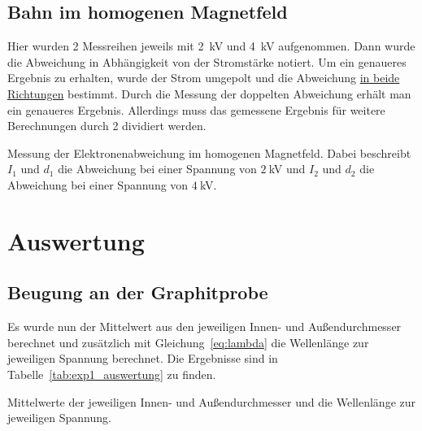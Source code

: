 \documentclass{article}
\begin{document}
%



\subsection{Bahn im homogenen Magnetfeld}
Hier wurden 2 Messreihen jeweils mit 2~kV und 4~kV aufgenommen. 	Dann wurde die Abweichung in Abhängigkeit von der Stromstärke notiert. Um ein genaueres Ergebnis zu erhalten, wurde der Strom umgepolt und die Abweichung \underline{in beide Richtungen} bestimmt. Durch die Messung der doppelten Abweichung erhält man ein genaueres Ergebnis. Allerdings muss das gemessene Ergebnis für weitere Berechnungen durch 2 dividiert werden.

\begin{table}[H]
\caption{Messung der Elektronenabweichung im homogenen Magnetfeld. Dabei beschreibt $I_1$ und $d_1$ die Abweichung bei einer Spannung von $2~$kV und $I_2$ und $d_2$ die Abweichung bei einer Spannung von $4~$kV.}
\label{tab:exp2_messung}

\end{table}




\section{Auswertung}

\subsection{Beugung an der Graphitprobe}

Es wurde nun der Mittelwert aus den jeweiligen Innen- und Außendurchmesser berechnet und zusätzlich mit Gleichung~\ref{eq:lambda} die Wellenlänge zur jeweiligen Spannung berechnet. Die Ergebnisse sind in Tabelle~\ref{tab:exp1_auswertung} zu finden.



\begin{table}[H]
\caption{Mittelwerte der jeweiligen Innen- und Außendurchmesser und die Wellenlänge zur jeweiligen Spannung.}
\label{tab:exp1_auswertung}

\end{table}
\end{document}
